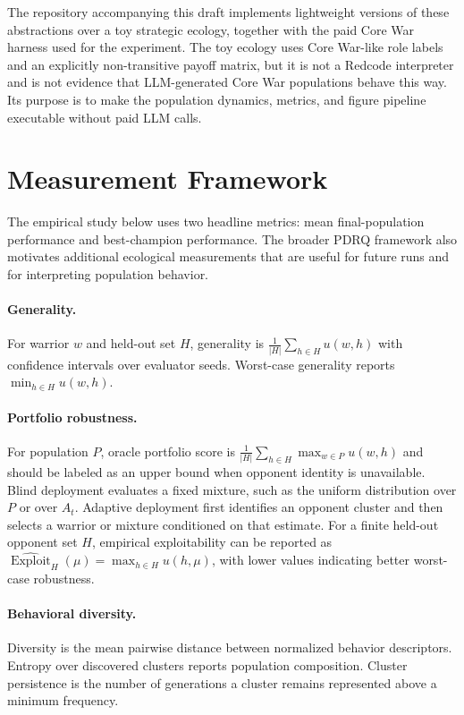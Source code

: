 \documentclass[11pt]{article}
\begin{document}
The repository accompanying this draft implements lightweight versions of these abstractions over a toy strategic ecology, together with the paid Core War harness used for the experiment. The toy ecology uses Core War-like role labels and an explicitly non-transitive payoff matrix, but it is not a Redcode interpreter and is not evidence that LLM-generated Core War populations behave this way. Its purpose is to make the population dynamics, metrics, and figure pipeline executable without paid LLM calls.

\section{Measurement Framework}

The empirical study below uses two headline metrics: mean final-population performance and best-champion performance. The broader PDRQ framework also motivates additional ecological measurements that are useful for future runs and for interpreting population behavior.

\paragraph{Generality.}
For warrior $w$ and held-out set $H$, generality is $\frac{1}{|H|}\sum_{h\in H}u(w,h)$ with confidence intervals over evaluator seeds. Worst-case generality reports $\min_{h\in H}u(w,h)$.

\paragraph{Portfolio robustness.}
For population $P$, oracle portfolio score is $\frac{1}{|H|}\sum_{h\in H}\max_{w\in P}u(w,h)$ and should be labeled as an upper bound when opponent identity is unavailable. Blind deployment evaluates a fixed mixture, such as the uniform distribution over $P$ or over $A_t$. Adaptive deployment first identifies an opponent cluster and then selects a warrior or mixture conditioned on that estimate. For a finite held-out opponent set $H$, empirical exploitability can be reported as $\widehat{\operatorname{Exploit}}_H(\mu)=\max_{h\in H}u(h,\mu)$, with lower values indicating better worst-case robustness.

\paragraph{Behavioral diversity.}
Diversity is the mean pairwise distance between normalized behavior descriptors. Entropy over discovered clusters reports population composition. Cluster persistence is the number of generations a cluster remains represented above a minimum frequency.
\end{document}
